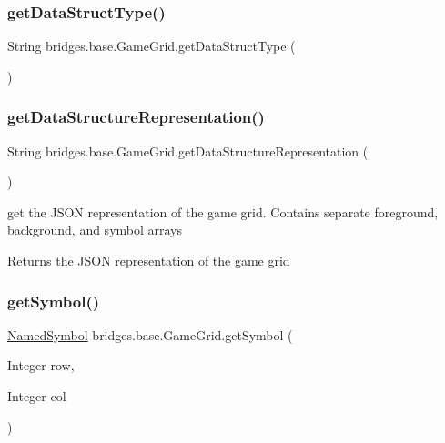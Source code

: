 \subsubsection{\texorpdfstring{getDataStructType()}{getDataStructType()}}
{\footnotesize\ttfamily String bridges.\+base.\+Game\+Grid.\+get\+Data\+Struct\+Type (\begin{DoxyParamCaption}{ }\end{DoxyParamCaption})}

\mbox{\label{classbridges_1_1base_1_1_game_grid_a3c72c7277f9c72ceff82fd063298541e}} 
\subsubsection{\texorpdfstring{getDataStructureRepresentation()}{getDataStructureRepresentation()}}
{\footnotesize\ttfamily String bridges.\+base.\+Game\+Grid.\+get\+Data\+Structure\+Representation (\begin{DoxyParamCaption}{ }\end{DoxyParamCaption})}

get the J\+S\+ON representation of the game grid. Contains separate foreground, background, and symbol arrays

\begin{DoxyReturn}{Returns}
the J\+S\+ON representation of the game grid 
\end{DoxyReturn}
\mbox{\label{classbridges_1_1base_1_1_game_grid_a974e33d5561a8f214966be626a9ca8ca}} 
\subsubsection{\texorpdfstring{getSymbol()}{getSymbol()}}
{\footnotesize\ttfamily \mbox{\hyperlink{enumbridges_1_1base_1_1_named_symbol}{Named\+Symbol}} bridges.\+base.\+Game\+Grid.\+get\+Symbol (\begin{DoxyParamCaption}\item[{Integer}]{row,  }\item[{Integer}]{col }\end{DoxyParamCaption})}

